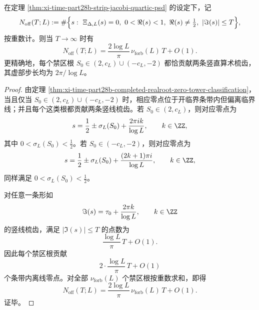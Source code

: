 \begin{theorem}[开临界条带离线零点的精确密度常数]\label{thm:xi-time-part28b-strip-offline-density-exact}
在定理 \ref{thm:xi-time-part28b-strip-jacobi-quartic-psd} 的设定下，记
\[
N_{\mathrm{off}}(T;L)
:=
\#\Bigl\{s:\ \Xi_{\Delta,L}(s)=0,\ 0<\Re(s)<1,\ \Re(s)\neq\tfrac12,\ |\Im(s)|\le T\Bigr\},
\]
按重数计。则当 \(T\to\infty\) 时有
\[
\boxed{\;
N_{\mathrm{off}}(T;L)
=
\frac{2\log L}{\pi}\,\nu_{\mathrm{forb}}(L)\,T+O(1).\;}
\]
更精确地，每个禁区根 \(S_0\in(2,c_L)\cup(-c_L,-2)\) 都恰贡献两条竖直算术梳齿，其虚部步长均为 \(2\pi/\log L\)。
\end{theorem}
\begin{proof}
由定理 \ref{thm:xi-time-part28b-completed-realroot-zero-tower-classification}，当且仅当 \(S_0\in(2,c_L)\cup(-c_L,-2)\) 时，相应零点位于开临界条带内但偏离临界线；并且每个这类根都贡献两条竖线梳齿。若 \(S_0\in(2,c_L)\)，则对应零点为
\[
s=\frac12\pm \sigma_L(S_0)+\frac{2\pi i k}{\log L},
\qquad k\in\ZZ,
\]
其中 \(0<\sigma_L(S_0)<\tfrac12\)。若 \(S_0\in(-c_L,-2)\)，则对应零点为
\[
s=\frac12\pm \sigma_L(S_0)+\frac{(2k+1)\pi i}{\log L},
\qquad k\in\ZZ,
\]
同样满足 \(0<\sigma_L(S_0)<\tfrac12\)。

对任意一条形如
\[
\Im(s)=\tau_0+\frac{2\pi k}{\log L},
\qquad k\in\ZZ
\]
的竖线梳齿，满足 \(|\Im(s)|\le T\) 的点数为
\[
\frac{\log L}{\pi}\,T+O(1).
\]
因此每个禁区根贡献
\[
2\cdot \frac{\log L}{\pi}\,T+O(1)
\]
个条带内离线零点。对全部 \(\nu_{\mathrm{forb}}(L)\) 个禁区根按重数求和，即得
\[
N_{\mathrm{off}}(T;L)
=
\frac{2\log L}{\pi}\,\nu_{\mathrm{forb}}(L)\,T+O(1).
\]
证毕。
\end{proof}

